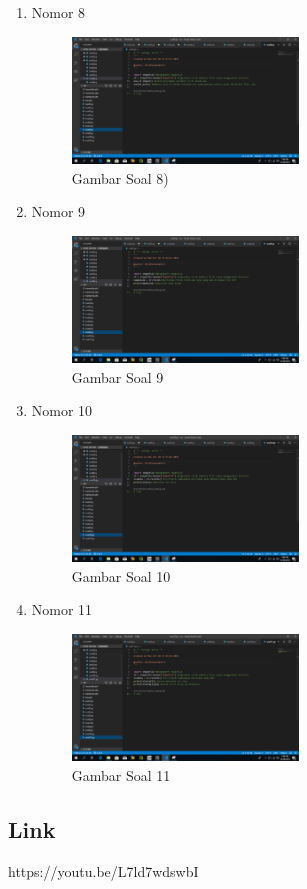 \begin{enumerate}
	\item Nomor 8
	
	\begin{figure}[H]
		\includegraphics[width=6cm]{figures/Tugas3/1174053/soal8.png}
		\centering
		\caption{Gambar Soal 8)}
	\end{figure}
	\item Nomor 9
	
	\begin{figure}[H]
		\includegraphics[width=6cm]{figures/Tugas3/1174053/soal9.png}
		\centering
		\caption{Gambar Soal 9}
	\end{figure}
	\item Nomor 10
	
	\begin{figure}[H]
		\includegraphics[width=6cm]{figures/Tugas3/1174053/soal10.png}
		\centering
		\caption{Gambar Soal 10 }
	\end{figure}
	\item Nomor 11
	
	\begin{figure}[H]
		\includegraphics[width=6cm]{figures/Tugas3/1174053/soal11.png}
		\centering
		\caption{Gambar Soal 11 }
	\end{figure}
\end{enumerate}
\subsection{Link}
https://youtu.be/L7ld7wdswbI